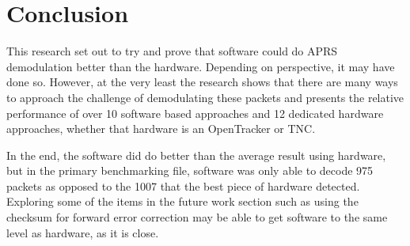 \chapter{Conclusion}
This research set out to try and prove that software could do APRS demodulation better than the hardware. Depending on perspective, it may have done so. However, at the very least the research shows that there are many ways to approach the challenge of demodulating these packets and presents the relative performance of over 10 software based approaches and 12 dedicated hardware approaches, whether that hardware is an OpenTracker or TNC.

In the end, the software did do better than the average result using hardware, but in the primary benchmarking file, software was only able to decode 975 packets as opposed to the 1007 that the best piece of hardware detected. Exploring some of the items in the future work section such as using the checksum for forward error correction may be able to get software to the same level as hardware, as it is close.